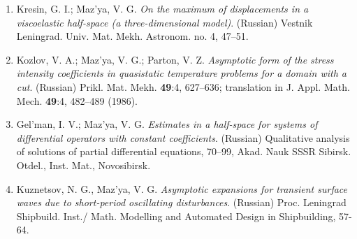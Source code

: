 \documentclass{article}
\begin{document}
\begin{enumerate}
{\bf 1985}
\item Kresin, G. I.; Maz'ya, V. G. {\it On the maximum of
displacements in
a viscoelastic half-space (a three-dimensional model)}.
(Russian) Vestnik Leningrad. Univ. Mat. Mekh. Astronom. no. 4, 47--51.
\item Kozlov, V. A.; Maz'ya, V. G.; Parton, V. Z. {\it Asymptotic form
of
the stress intensity coefficients in
quasistatic temperature problems for a domain with a cut}. (Russian)
Prikl.
Mat. Mekh. {\bf 49}:4, 627--636; translation in J.
Appl. Math. Mech. {\bf 49}:4, 482--489 (1986).
\item Gel'man, I. V.; Maz'ya, V. G. {\it Estimates in a half-space for
systems of differential operators
  with constant coefficients}. (Russian) Qualitative analysis of
solutions
of partial differential equations, 70--99,
Akad. Nauk SSSR Sibirsk. Otdel., Inst. Mat., Novosibirsk.
\item Kuznetsov, N. G., Maz'ya, V. G. {\it Asymptotic expansions for
transient surface waves due to short-period oscillating
disturbances}. (Russian) Proc. Leningrad Shipbuild. Inst./ Math.
Modelling
and Automated Design in Shipbuilding, 57-64.\hfill\break


\end{enumerate}
\end{document}
